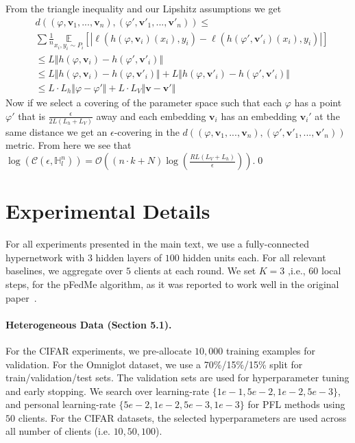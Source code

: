 \documentclass{article}
\newcommand{\bv}{\boldsymbol{v}}
\begin{document}
From the triangle inequality and our Lipshitz assumptions we get
\begin{align}
    &d((\varphi,\bv_1,...,\bv_n),(\varphi',\bv'_1,...,\bv'_n))\leq \\
    & \sum\frac{1}{n}\underset{x_i,y_i
    \sim P_i}{\mathds{E}}\left[\left| \ell(h(\varphi,\bv_i)(x_i),y_i)- \ell(h(\varphi',\bv'_i)(x_i),y_i)\right|\right] \nonumber \\
    & \leq L\Vert h(\varphi,\bv_i)-h(\varphi',\bv'_i)\Vert \nonumber \\
    &\leq L\Vert h(\varphi,\bv_i)-h(\varphi,\bv'_i)\Vert+ L\Vert h(\varphi,\bv'_i)-h(\varphi',\bv'_i)\Vert \nonumber \\
    &\leq L\cdot L_h\Vert\varphi-\varphi'\Vert+L\cdot L_V\Vert\bv-\bv'\Vert \nonumber
\end{align}
Now if we select a covering of the parameter space such that each $\varphi$ has a point $\varphi'$ that is $\frac{\epsilon}{2L(L_h+L_V)}$ away and each embedding $\bv_i$ has an embedding $\bv_i'$ at the same distance we get an $\epsilon$-covering in the $d((\varphi,\bv_1,...,\bv_n),(\varphi',\bv'_1,...,\bv'_n))$ metric. From here we see that $\log(\mathcal{C}(\epsilon,\mathds{H}^n_l))=\mathcal{O}\left((n\cdot k+N)\log \left(\frac{RL(L_V+L_h)}{\epsilon}\right)\right)$.\qed

\section{Experimental Details}\label{app:exp_details}

For all experiments presented in the main text, we use a fully-connected hypernetwork with $3$ hidden layers of $100$ hidden units each. For all relevant baselines, we aggregate over $5$ clients at each round. We set $K=3$ ,i.e., $60$ local steps, for the pFedMe algorithm, as it was reported to work well in the original paper~\citep{Dinh2020PersonalizedFL}.

\paragraph{Heterogeneous Data (Section 5.1).} 
For the CIFAR experiments, we pre-allocate $10,000$ training examples for validation. For the Omniglot dataset, we use a 70\%/15\%/15\% split for train/validation/test sets. 
The validation sets are used for hyperparameter tuning and early stopping. We search over learning-rate $\{1e-1, 5e-2, 1e-2, 5e-3\}$, and personal learning-rate $\{5e-2, 1e-2, 5e-3, 1e-3\}$ for PFL methods using $50$ clients. For the CIFAR datasets, the selected hyperparameters are used across all number of clients (i.e. $10, 50, 100$). 
\end{document}

